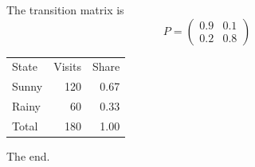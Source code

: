 \documentclass{article}
\begin{document}
The transition matrix is
\[ P = \begin{pmatrix} 0.9 & 0.1 \\ 0.2 & 0.8 \end{pmatrix} \]
\begin{tabular}{lrr}
State & Visits & Share \\
Sunny & 120 & 0.67 \\
Rainy & 60 & 0.33 \\
Total & 180 & 1.00 \\
\end{tabular}

The end.
\end{document}
